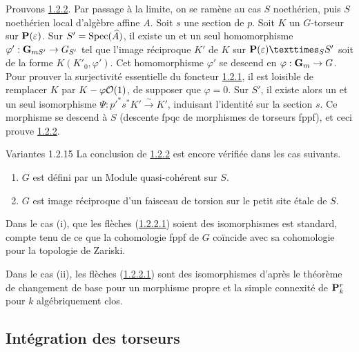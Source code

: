 \documentclass[10pt]{../fichiers-configuration-latex/smfart}
\begin{document}
\subsubsection{}
Prouvons \hyperref[XVIII.thm1.2.2]{1.2.2}. Par passage à la limite, on se ramène au cas $S$
noethérien, puis $S$ noethérien local d'algèbre affine $A$. Soit $s$
une section de $p$. Soit $K$ un $G$-torseur sur
$\mathbf{P}(\varepsilon)$. Sur $S'=\operatorname{Spec}(\widehat{A})$, il existe un et
un seul homomorphisme $\varphi':\mathbf{G}_{mS'}\rightarrow G_{S'}$
tel que l'image réciproque $K'$ de $K$ sur
$\fprod{\PP(\epsilon)}{S'}{S}$ soit de la forme
$K(K'_{0},\varphi')$. Cet homomorphisme $\varphi'$ se descend en
$\varphi:\mathbf{G}_{m}\rightarrow G$. Pour prouver la surjectivité
essentielle du foncteur \hyperref[XVIII.subsubsec1.2.1]{1.2.1}, il est loisible de
remplacer $K$ par 
$K-\varphi{\mathcal O}(1)$, \ie de supposer que $\varphi=0$. Sur $S'$, il
existe alors un et un seul isomorphisme
$\Psi:{p'}^{\ast}s^{\ast}K'\xrightarrow{\sim}K'$, induisant l'identité
sur la section $s$. Ce morphisme se descend à $S$ (descente fpqc de
morphismes de torseurs fppf), et ceci prouve \hyperref[XVIII.thm1.2.2]{1.2.2}.

\begin{enonce*}{Variantes 1.2.15}
La conclusion de \hyperref[XVIII.thm1.2.2]{1.2.2} est encore vérifiée dans les cas
suivants.
\begin{enumerate}
\renewcommand{\theenumi}{\roman{enumi}}
\renewcommand{\labelenumi}{(\theenumi)}
\item $G$ est défini par un Module quasi-cohérent sur $S$.

\item $G$ est image réciproque d'un faisceau de torsion sur le petit
  site étale de $S$.
\end{enumerate}
\end{enonce*}

Dans le cas (i), que les flèches (\hyperref[XVIII.par1.2.2.1]{1.2.2.1}) soient des
isomorphismes 
est standard, compte tenu de ce que la cohomologie fppf de $G$
coïncide avec sa cohomologie pour la topologie de Zariski.

Dans le cas (ii), les flèches (\hyperref[XVIII.par1.2.2.1]{1.2.2.1}) sont des
isomorphismes d'après 
le théorème de changement de base pour un morphisme propre et la
simple connexité de $\mathbf{P}^{r}_{k}$ pour $k$ algébriquement clos.

\subsection{Intégration des torseurs}
\end{document}
